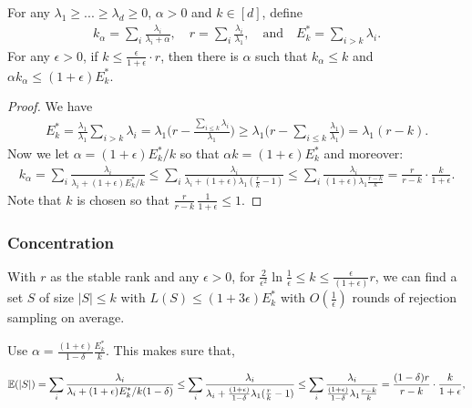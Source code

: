 \documentclass[12pt]{sty/colt2019/colt2018-arxiv}
\begin{document}
\begin{theorem}
For any $\lambda_1\geq...\geq\lambda_d\geq 0$, $\alpha>0$ and $k\in[d]$, define
\begin{align*}
  k_\alpha=\sum_i\frac{\lambda_i}{\lambda_i+\alpha},\quad
  r =\sum_i\frac{\lambda_i}{\lambda_1},\quad\text{and}\quad E_{k}^* =
  \sum_{i>k}\lambda_i.
  \end{align*}
For any $\epsilon>0$, if $k\leq \frac{\epsilon}{1+\epsilon}\cdot r$, then there is $\alpha$ such that
    $k_\alpha\leq k$ and  $\alpha k_\alpha\leq (1+\epsilon) E_k^*$.
 \end{theorem}
\begin{proof}
We have
  \begin{align*}
E_{k}^*=
    \frac{\lambda_1}{\lambda_1}\sum_{i>k}\lambda_i =\lambda_1\Big( r -
 \frac{\sum_{i\leq k}\lambda_i}{\lambda_1}\Big)\geq \lambda_1\Big( r -  \sum_{i\leq k}\frac{\lambda_1}{\lambda_1}\Big) =\lambda_1( r -
    k).
  \end{align*}
  Now we let $\alpha = (1+\epsilon) E_k^*/k$ so that $\alpha k
  =(1+\epsilon)E_k^*$ and moreover: 
  \begin{align*}
    k_\alpha=\sum_i\frac{\lambda_i}{\lambda_i+(1+\epsilon)E_{k}^*/k}
    \leq \sum_i\frac{\lambda_i}{\lambda_i+(1+\epsilon)\lambda_1(\frac rk-1)}
    \leq\sum_i\frac{\lambda_i}{(1+\epsilon)\lambda_1\frac{r-k}k}=\frac{r}{r-k}\cdot
    \frac k{1+\epsilon}.
  \end{align*}
  Note that $k$ is chosen so that $\frac
  r{r-k}\,\frac1{1+\epsilon}\leq 1$.
\end{proof}



\subsubsection{Concentration}


\begin{lemma} With $r$ as the stable rank and any $\epsilon > 0$, for $ \frac 2{\epsilon^2} \ln \frac1{\epsilon} \leq k \leq  \frac {\epsilon }{(1+\epsilon)}  r $, we can find a set $S$ of size $|S|\leq k$ with $L(S)  \leq (1+3\epsilon)  E^*_k$ with $O(\frac1{\epsilon})$ rounds of rejection sampling on average. 
\end{lemma}


Use $\alpha = \frac{(1+\epsilon)}{1-\delta} \frac{E^*_k}{k}$. This makes sure that, 

\begin{align*}
\mathbb E(|S|) = \sum_i\frac{\lambda_i}{\lambda_i+(1+\epsilon)E_{k}^*/k(1-\delta)}
\leq \sum_i\frac{\lambda_i}{\lambda_i+\frac{(1+\epsilon)}{1-\delta}\lambda_1(\frac rk-1)}
\leq\sum_i\frac{\lambda_i}{\frac{(1+\epsilon)}{1-\delta}\lambda_1\frac{r-k}k}=\frac{(1-\delta)r}{r-k}\cdot
\frac k{1+\epsilon},
\end{align*}
	
\end{document}
